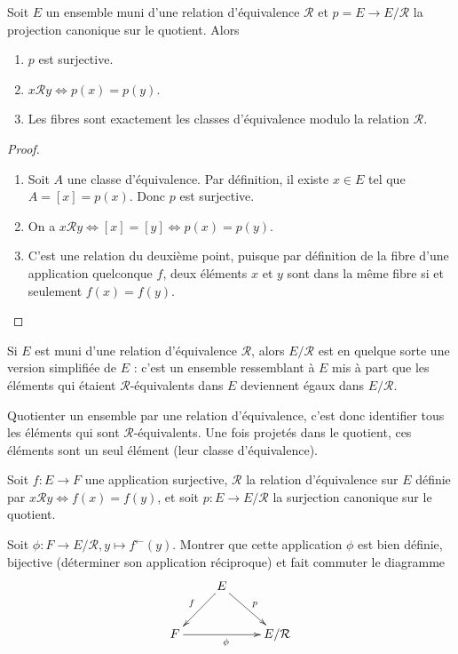 \begin{proposition}
Soit $E$ un ensemble muni d'une relation d'équivalence ${\mathcal R}$ et $p = E\to E/\mathcal R$ la projection canonique sur le quotient. Alors 
\begin{enumerate}
\item $p$ est surjective.
\item $x\mathcal R y \iff p(x)=p(y)$.
\item Les fibres sont exactement les classes d'équivalence modulo la relation $\mathcal R$.
\end{enumerate}
\end{proposition}
\begin{proof}
\begin{enumerate}
\item Soit $A$ une classe d'équivalence. Par définition, il existe $x\in E$ tel que $A = [x] = p(x)$. Donc $p$ est surjective.
\item On a $x\mathcal R y \iff [x] = [y] \iff p(x)=p(y)$.
\item C'est une relation du deuxième point, puisque par définition de la fibre d'une application quelconque $f$, deux éléments $x$ et $y$ sont dans la même fibre si et seulement $f(x)=f(y)$.
\end{enumerate}
\end{proof}


\begin{mdframed}[linewidth=2]
Si $E$ est muni d'une relation d'équivalence $\mathcal R$, alors $E/\mathcal R$ est en quelque sorte une version  \og simplifiée\fg{} de $E$ : c'est un ensemble ressemblant à $E$ mis à part que les éléments qui étaient $\mathcal R$-équivalents dans $E$ deviennent  égaux dans $E/\mathcal R$.

Quotienter un ensemble par une relation d'équivalence, c'est donc identifier tous les éléments qui sont $\mathcal R$-équivalents. Une fois projetés dans le quotient, ces éléments sont un seul élément (leur classe d'équivalence).
\end{mdframed}

\begin{exercice}
Soit $f : E\to F$ une application surjective, $\mathcal R$ la relation d'équivalence sur $E$ définie par $x\mathcal R y \iff f(x)=f(y)$, et soit $p : E\to E/\mathcal R$ la surjection canonique sur le quotient. 

Soit $\phi :  F \to E/\mathcal R, y\mapsto f^\leftarrow(y)$. Montrer que  cette application $\phi$ est bien définie, bijective (déterminer son application réciproque) et fait commuter le diagramme
\[\xymatrix{
& E \ar[dl]_{f} \ar[dr]^p & \\
F \ar[rr]_{\phi}& & E/\mathcal R
}\]
\end{exercice}



